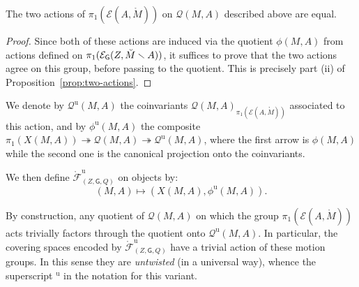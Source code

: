 \documentclass[AHL,Unicode,published]{cedram}
\newcommand{\Int}{\mathring}
\newcommand{\unt}{\mathrm{u}}
\newcommand{\sG}{\mathsf{G}}
\newcommand{\cE}{\mathcal{E}}
\newcommand{\cF}{\mathcal{F}}
\newcommand{\cQ}{\mathcal{Q}}
\begin{document}
\begin{prop}\label{prop:two-actions-on-Q}
The two actions of $\pi_{1}(\cE(A,\Int{M}))$ on $\cQ(M,A)$ described above are equal.
\end{prop}

\begin{proof}
Since both of these actions are induced via the quotient $\phi(M,A)$ from actions defined on $\pi_{1}(\cE_{\sG}(Z,\Breve{M}\smallsetminus A))$, it suffices to prove that the two actions agree on this group, before passing to the quotient. This is precisely part (ii) of Proposition~\ref{prop:two-actions}.
\end{proof}

\begin{nota}\label{nota:untwisted}
We denote by $\cQ^{\unt}(M,A)$ the coinvariants $\cQ(M,A)_{\pi_{1}(\cE(A,\Int{M}))}$ associated to this action, and by $\phi^{\unt}(M,A)$ the composite $\pi_{1}(X(M,A)) \twoheadrightarrow \cQ(M,A) \twoheadrightarrow \cQ^{\unt}(M,A)$, where the first arrow is $\phi(M,A)$ while the second one is the canonical projection onto the coinvariants.
\end{nota}

We then define $\Int{\cF}^{\unt}_{(Z,\sG,Q)}$ on objects by:
\begin{equation}\label{eq:def_Int(F)_unt_objects}
(M,A) \longmapsto (X(M,A),\phi^{\unt}(M,A)).
\end{equation}

\begin{rema}\label{rmk:justification_untwisted}
By construction, any quotient of $\cQ(M,A)$ on which the group $\pi_{1}(\cE(A,\Int{M}))$ acts trivially factors through the quotient onto $\cQ^{\unt}(M,A)$. In particular, the covering spaces encoded by $\Int{\cF}^{\unt}_{(Z,\sG,Q)}$ have a trivial action of these motion groups. In this sense they are \emph{untwisted} (in a universal way), whence the superscript ${}^{\unt}$ in the notation for this variant.
\end{rema}
\end{document}
